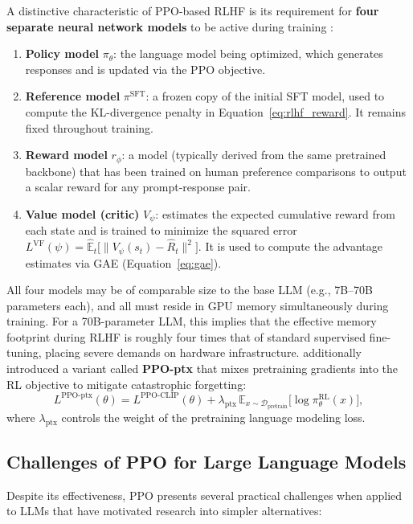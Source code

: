 A distinctive characteristic of PPO-based RLHF is its requirement for \textbf{four separate neural network models} to be active during training \cite{ouyang2022instructgpt, zheng2023secrets}:
\begin{enumerate}
    \item \textbf{Policy model} $\pi_\theta$: the language model being optimized, which generates responses and is updated via the PPO objective.
    \item \textbf{Reference model} $\pi^{\text{SFT}}$: a frozen copy of the initial SFT model, used to compute the KL-divergence penalty in Equation~\eqref{eq:rlhf_reward}. It remains fixed throughout training.
    \item \textbf{Reward model} $r_\phi$: a model (typically derived from the same pretrained backbone) that has been trained on human preference comparisons to output a scalar reward for any prompt-response pair.
    \item \textbf{Value model (critic)} $V_\psi$: estimates the expected cumulative reward from each state and is trained to minimize the squared error $L^{\text{VF}}(\psi) = \hat{\mathbb{E}}_t\big[\|V_\psi(s_t) - \hat{R}_t\|^2\big]$. It is used to compute the advantage estimates via GAE (Equation~\ref{eq:gae}).
\end{enumerate}
All four models may be of comparable size to the base LLM (e.g., 7B--70B parameters each), and all must reside in GPU memory simultaneously during training. For a 70B-parameter LLM, this implies that the effective memory footprint during RLHF is roughly four times that of standard supervised fine-tuning, placing severe demands on hardware infrastructure. \cite{ouyang2022instructgpt} additionally introduced a variant called \textbf{PPO-ptx} that mixes pretraining gradients into the RL objective to mitigate catastrophic forgetting:
\begin{equation}
    L^{\text{PPO-ptx}}(\theta) = L^{\text{PPO-CLIP}}(\theta) + \lambda_{\text{ptx}} \, \mathbb{E}_{x \sim \mathcal{D}_{\text{pretrain}}} \big[\log \pi_\theta^{\text{RL}}(x)\big],
\end{equation}
where $\lambda_{\text{ptx}}$ controls the weight of the pretraining language modeling loss.

\subsection{Challenges of PPO for Large Language Models}

Despite its effectiveness, PPO presents several practical challenges when applied to LLMs that have motivated research into simpler alternatives:

